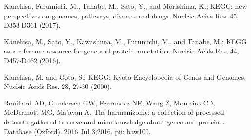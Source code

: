 
\begin{thebibliography}{00}

 Kanehisa, Furumichi, M., Tanabe, M., Sato, Y., and Morishima, K.; 
\newblock KEGG: new perspectives on genomes, pathways, diseases and drugs. 
\newblock Nucleic Acids Res. 45, D353-D361 (2017).

 Kanehisa, M., Sato, Y., Kawashima, M., Furumichi, M., and Tanabe, M.; 
\newblock KEGG as a reference resource for gene and protein annotation. 
\newblock Nucleic Acids Res. 44, D457-D462 (2016).

 Kanehisa, M. and Goto, S.; 
\newblock KEGG: Kyoto Encyclopedia of Genes and Genomes. 
\newblock Nucleic Acids Res. 28, 27-30 (2000). 

 Rouillard AD, Gundersen GW, Fernandez NF, Wang Z, Monteiro CD, McDermott MG, Ma'ayan A. 
\newblock The harmonizome: a collection of processed datasets gathered to serve and mine knowledge about genes and proteins. 
\newblock Database (Oxford). 2016 Jul 3;2016. pii: baw100. 

\end{thebibliography}

